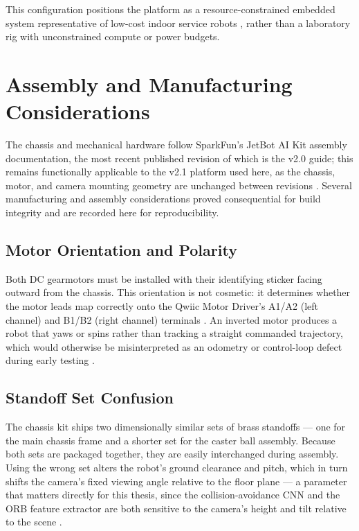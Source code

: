 This configuration positions the platform as a resource-constrained embedded system representative of low-cost indoor service robots \cite{SparkFun:2020}, rather than a laboratory rig with unconstrained compute or power budgets.

\section{Assembly and Manufacturing Considerations}

The chassis and mechanical hardware follow SparkFun's JetBot AI Kit assembly documentation, the most recent published revision of which is the v2.0 guide; this remains functionally applicable to the v2.1 platform used here, as the chassis, motor, and camera mounting geometry are unchanged between revisions \cite{SparkFunJetBotAssembly:2020}. Several manufacturing and assembly considerations proved consequential for build integrity and are recorded here for reproducibility.

\subsection{Motor Orientation and Polarity}

Both DC gearmotors must be installed with their identifying sticker facing outward from the chassis. This orientation is not cosmetic: it determines whether the motor leads map correctly onto the Qwiic Motor Driver's A1/A2 (left channel) and B1/B2 (right channel) terminals \cite{SparkFun:2019b}. An inverted motor produces a robot that yaws or spins rather than tracking a straight commanded trajectory, which would otherwise be misinterpreted as an odometry or control-loop defect during early testing \cite{SparkFunJetBotAssembly:2020}.

\subsection{Standoff Set Confusion}

The chassis kit ships two dimensionally similar sets of brass standoffs --- one for the main chassis frame and a shorter set for the caster ball assembly. Because both sets are packaged together, they are easily interchanged during assembly. Using the wrong set alters the robot's ground clearance and pitch, which in turn shifts the camera's fixed viewing angle relative to the floor plane --- a parameter that matters directly for this thesis, since the collision-avoidance CNN and the ORB feature extractor are both sensitive to the camera's height and tilt relative to the scene \cite{SparkFunJetBotAssembly:2020}.

